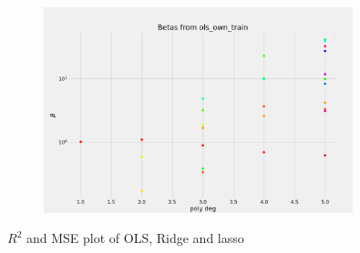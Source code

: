\begin{figure}[H]
    \centering
    \includegraphics[width=0.8\textwidth]{Figures/b_beta.png}
\end{figure}








$R^2$ and MSE plot of OLS, Ridge and lasso
